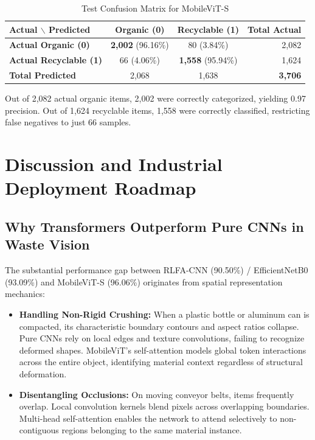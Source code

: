 \documentclass[conference]{IEEEtran}
\begin{document}
\begin{table}[htbp]
\caption{Test Confusion Matrix for MobileViT-S}
\label{tab:confusion_matrix}
\centering
\begin{tabular}{@{}lccr@{}}
\toprule
\textbf{Actual $\backslash$ Predicted} & \textbf{Organic (0)} & \textbf{Recyclable (1)} & \textbf{Total Actual} \\ \midrule
\textbf{Actual Organic (0)} & \textbf{2,002} (96.16\%) & 80 (3.84\%) & 2,082 \\
\textbf{Actual Recyclable (1)} & 66 (4.06\%) & \textbf{1,558} (95.94\%) & 1,624 \\ \midrule
\textbf{Total Predicted} & 2,068 & 1,638 & \textbf{3,706} \\ \bottomrule
\end{tabular}
\end{table}

Out of 2,082 actual organic items, 2,002 were correctly categorized, yielding 0.97 precision. Out of 1,624 recyclable items, 1,558 were correctly classified, restricting false negatives to just 66 samples.

\section{Discussion and Industrial Deployment Roadmap}

\subsection{Why Transformers Outperform Pure CNNs in Waste Vision}
The substantial performance gap between RLFA-CNN (90.50\%) / EfficientNetB0 (93.09\%) and MobileViT-S (96.06\%) originates from spatial representation mechanics:
\begin{itemize}
    \item \textbf{Handling Non-Rigid Crushing:} When a plastic bottle or aluminum can is compacted, its characteristic boundary contours and aspect ratios collapse. Pure CNNs rely on local edges and texture convolutions, failing to recognize deformed shapes. MobileViT's self-attention models global token interactions across the entire object, identifying material context regardless of structural deformation.
    \item \textbf{Disentangling Occlusions:} On moving conveyor belts, items frequently overlap. Local convolution kernels blend pixels across overlapping boundaries. Multi-head self-attention enables the network to attend selectively to non-contiguous regions belonging to the same material instance.
\end{itemize}
\end{document}
